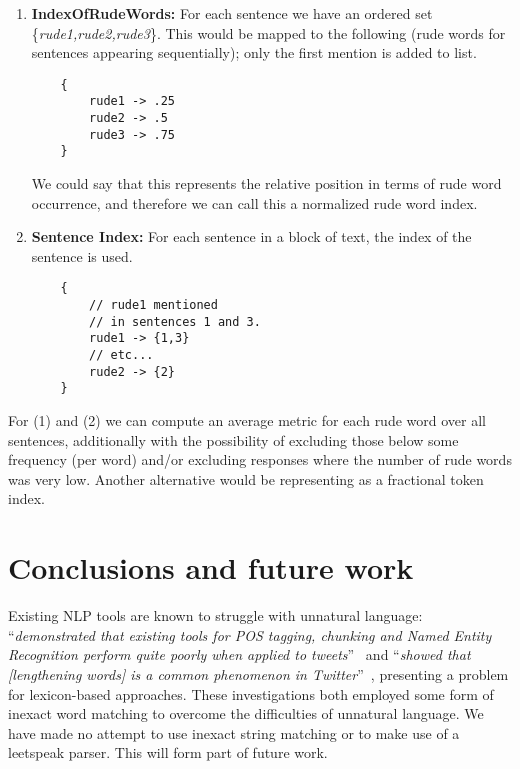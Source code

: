 \documentclass[letterpaper]{article}
\begin{document}
\begin{enumerate}
\item {\textbf{IndexOfRudeWords:}} For each sentence we have an
  ordered set \{{\emph{rude1,rude2,rude3}}\}. This would be mapped to
  the following (rude words for sentences appearing sequentially);
  only the first mention is added to list.\\

\begin{verbatim}
    {
        rude1 -> .25
        rude2 -> .5
        rude3 -> .75
    }

\end{verbatim}

We could say that this represents the relative position in terms of rude word occurrence, and therefore we can call this a normalized rude word index.\newline

\item {\textbf{Sentence Index:}} For each sentence in a block of text, the index of
the sentence is used.\\

\begin{verbatim}
    {
        // rude1 mentioned 
        // in sentences 1 and 3.
        rude1 -> {1,3}   
        // etc...
        rude2 -> {2}
    }

\end{verbatim}
\end{enumerate}

For (1) and (2) we can compute an average metric for each rude word
over all sentences, additionally with the possibility of excluding
those below some frequency (per word) and/or excluding responses where
the number of rude words was very low. Another alternative would be
representing as a fractional token index.


\section{Conclusions and future work}

Existing NLP tools are known to struggle with unnatural language:
``{\emph{demonstrated that existing tools for POS tagging, chunking
and Named Entity Recognition perform quite poorly when applied to
tweets}}''~\cite{ritter-et-al:2011} and ``{\emph{showed that
[lengthening words] is a common phenomenon in
Twitter}}''~\cite{brody+diakopoulos:2011}, presenting a problem for
lexicon-based approaches. These investigations both employed some form
of inexact word matching to overcome the difficulties of unnatural
language. We have made no attempt to use inexact string matching or to
make use of a leetspeak parser. This will form part of future work.
\end{document}
